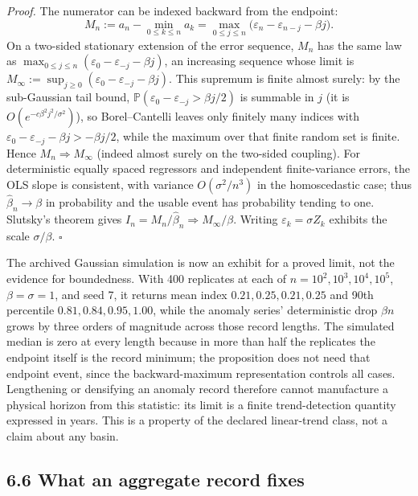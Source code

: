 \documentclass[11pt]{article}
\begin{document}
\emph{Proof.} The numerator can be indexed backward from the endpoint:
$$M_n:=a_n-\min_{0\le k\le n}a_k=\max_{0\le j\le n}\bigl(\varepsilon_n-\varepsilon_{n-j}-\beta j\bigr).$$
On a two-sided stationary extension of the error sequence, \(M_n\) has the same law as \(\max_{0\le j\le n}(\varepsilon_0-\varepsilon_{-j}-\beta j)\), an increasing sequence whose limit is \(M_\infty:=\sup_{j\ge0}(\varepsilon_0-\varepsilon_{-j}-\beta j)\). This supremum is finite almost surely: by the sub-Gaussian tail bound, \(\mathbb P(\varepsilon_0-\varepsilon_{-j}>\beta j/2)\) is summable in \(j\) (it is \(O(e^{-c\beta^2j^2/\sigma^2})\)), so Borel--Cantelli leaves only finitely many indices with \(\varepsilon_0-\varepsilon_{-j}-\beta j>-\beta j/2\), while the maximum over that finite random set is finite. Hence \(M_n\Rightarrow M_\infty\) (indeed almost surely on the two-sided coupling). For deterministic equally spaced regressors and independent finite-variance errors, the OLS slope is consistent, with variance \(O(\sigma^2/n^3)\) in the homoscedastic case; thus \(\widehat\beta_n\to\beta\) in probability and the usable event has probability tending to one. Slutsky's theorem gives \(I_n=M_n/\widehat\beta_n\Rightarrow M_\infty/\beta\). Writing \(\varepsilon_k=\sigma Z_k\) exhibits the scale \(\sigma/\beta\). \(\square\)

The archived Gaussian simulation is now an exhibit for a proved limit, not the evidence for boundedness. With 400 replicates at each of \(n=10^2,10^3,10^4,10^5\), \(\beta=\sigma=1\), and seed 7, it returns mean index \(0.21,0.25,0.21,0.25\) and 90th percentile \(0.81,0.84,0.95,1.00\), while the anomaly series' deterministic drop \(\beta n\) grows by three orders of magnitude across those record lengths. The simulated median is zero at every length because in more than half the replicates the endpoint itself is the record minimum; the proposition does not need that endpoint event, since the backward-maximum representation controls all cases. Lengthening or densifying an anomaly record therefore cannot manufacture a physical horizon from this statistic: its limit is a finite trend-detection quantity expressed in years. This is a property of the declared linear-trend class, not a claim about any basin.

\vspace{0.8em}

\subsection*{6.6 What an aggregate record fixes}\label{66-what-an-aggregate-record-fixes}
\end{document}

